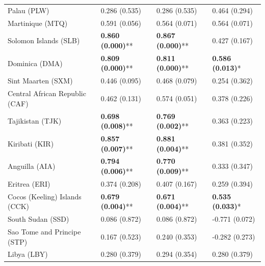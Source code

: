 \begin{longtable}{p{5cm}p{3cm}p{3cm}p{5cm}}
Palau (PLW) & \textcolor{atlOrange600}{0.286 (0.535)} & \textcolor{atlOrange600}{0.286 (0.535)} & \textcolor{atlOrange600}{0.464 (0.294)} \\
Martinique (MTQ) & \textcolor{atlOrange600}{0.591 (0.056)} & \textcolor{atlOrange600}{0.564 (0.071)} & \textcolor{atlOrange600}{0.564 (0.071)} \\
Solomon Islands (SLB) & \textcolor{atlLime600}{\textbf{0.860 (0.000)}**} & \textcolor{atlLime600}{\textbf{0.867 (0.000)}**} & \textcolor{atlOrange600}{0.427 (0.167)} \\
Dominica (DMA) & \textcolor{atlLime600}{\textbf{0.809 (0.000)}**} & \textcolor{atlLime600}{\textbf{0.811 (0.000)}**} & \textcolor{atlLime600}{\textbf{0.586 (0.013)}*} \\
Sint Maarten (SXM) & \textcolor{atlOrange600}{0.446 (0.095)} & \textcolor{atlOrange600}{0.468 (0.079)} & \textcolor{atlOrange600}{0.254 (0.362)} \\
Central African Republic (CAF) & \textcolor{atlOrange600}{0.462 (0.131)} & \textcolor{atlOrange600}{0.574 (0.051)} & \textcolor{atlOrange600}{0.378 (0.226)} \\
Tajikistan (TJK) & \textcolor{atlLime600}{\textbf{0.698 (0.008)}**} & \textcolor{atlLime600}{\textbf{0.769 (0.002)}**} & \textcolor{atlOrange600}{0.363 (0.223)} \\
Kiribati (KIR) & \textcolor{atlLime600}{\textbf{0.857 (0.007)}**} & \textcolor{atlLime600}{\textbf{0.881 (0.004)}**} & \textcolor{atlOrange600}{0.381 (0.352)} \\
Anguilla (AIA) & \textcolor{atlLime600}{\textbf{0.794 (0.006)}**} & \textcolor{atlLime600}{\textbf{0.770 (0.009)}**} & \textcolor{atlOrange600}{0.333 (0.347)} \\
Eritrea (ERI) & \textcolor{atlOrange600}{0.374 (0.208)} & \textcolor{atlOrange600}{0.407 (0.167)} & \textcolor{atlOrange600}{0.259 (0.394)} \\
Cocos (Keeling) Islands (CCK) & \textcolor{atlLime600}{\textbf{0.679 (0.004)}**} & \textcolor{atlLime600}{\textbf{0.671 (0.004)}**} & \textcolor{atlLime600}{\textbf{0.535 (0.033)}*} \\
South Sudan (SSD) & \textcolor{atlOrange600}{0.086 (0.872)} & \textcolor{atlOrange600}{0.086 (0.872)} & \textcolor{atlOrange600}{-0.771 (0.072)} \\
Sao Tome and Principe (STP) & \textcolor{atlOrange600}{0.167 (0.523)} & \textcolor{atlOrange600}{0.240 (0.353)} & \textcolor{atlOrange600}{-0.282 (0.273)} \\
Libya (LBY) & \textcolor{atlOrange600}{0.280 (0.379)} & \textcolor{atlOrange600}{0.294 (0.354)} & \textcolor{atlOrange600}{0.280 (0.379)} \\

\end{longtable}
